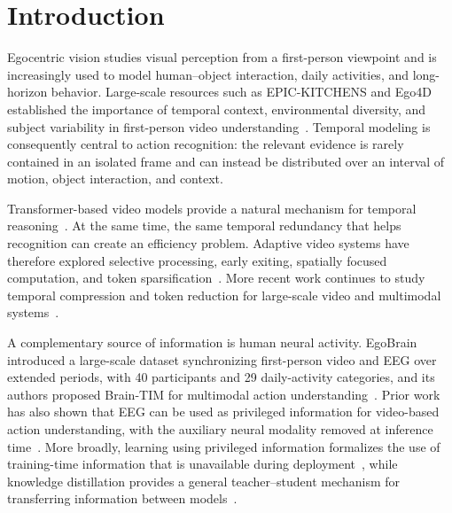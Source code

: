 \documentclass[runningheads]{llncs}
\begin{document}
\section{Introduction}

Egocentric vision studies visual perception from a first-person viewpoint and is increasingly used to model human--object interaction, daily activities, and long-horizon behavior. Large-scale resources such as EPIC-KITCHENS and Ego4D established the importance of temporal context, environmental diversity, and subject variability in first-person video understanding~\cite{damen2022epickitchens,grauman2022ego4d}. Temporal modeling is consequently central to action recognition: the relevant evidence is rarely contained in an isolated frame and can instead be distributed over an interval of motion, object interaction, and context.

Transformer-based video models provide a natural mechanism for temporal reasoning~\cite{bertasius2021timesformer,arnab2021vivit,tong2022videomae}. At the same time, the same temporal redundancy that helps recognition can create an efficiency problem. Adaptive video systems have therefore explored selective processing, early exiting, spatially focused computation, and token sparsification~\cite{wang2021adafocus,ghodrati2021frameexit,ryoo2021tokenlearner,rao2021dynamicvit,wang2022adafocusv2}. More recent work continues to study temporal compression and token reduction for large-scale video and multimodal systems~\cite{fu2025framefusion,li2026adaptok}.

A complementary source of information is human neural activity. EgoBrain introduced a large-scale dataset synchronizing first-person video and EEG over extended periods, with 40 participants and 29 daily-activity categories, and its authors proposed Brain-TIM for multimodal action understanding~\cite{lin2026egobrain}. Prior work has also shown that EEG can be used as privileged information for video-based action understanding, with the auxiliary neural modality removed at inference time~\cite{cavazza2022actions}. More broadly, learning using privileged information formalizes the use of training-time information that is unavailable during deployment~\cite{vapnik2009privileged}, while knowledge distillation provides a general teacher--student mechanism for transferring information between models~\cite{hinton2015distillation}.
\end{document}
